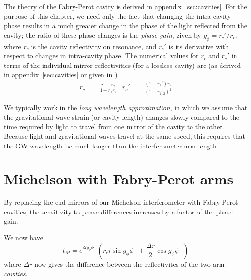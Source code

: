 The theory of the Fabry-Perot cavity is derived in 
appendix~\ref{sec:cavities}.  For the purpose of this chapter, we
need only the fact that changing the intra-cavity phase results in a
much greater change in the phase of the light reflected from the
cavity; the ratio of these phase changes is the \emph{phase gain},
given by $g_\phi = r_c'/r_c$, where $r_c$ is the cavity reflectivity on
resonance, and $r_c'$ is its derivative with respect to changes in
intra-cavity phase.  The numerical values for $r_c$ and $r_c'$ in terms of the individual mirror reflectivities (for a lossless cavity) are (as derived in appendix~\ref{sec:cavities} or given in \cite{LigoFreqResponse97}):
%
\begin{align}
r_c & = \frac{r_1 - r_2}{1 - r_1 r_2} &
r_c'& = \frac{\left(1 - {r_1}^2\right)r_2}{\left(1 - r_1 r_2\right)^2}
\end{align}



\label{sec:long-wavelength}We typically work in the \emph{long wavelength approximation}, in
which we assume that the gravitational wave strain (or cavity length)
changes slowly compared to the time required by light to travel from
one mirror of the cavity to the other.  Because light and
gravitational waves travel at the same speed, this requires that the
GW wavelength be much longer than the interferometer arm length.  

\section{Michelson with Fabry-Perot arms}

By replacing the end mirrors of our Michelson interferometer with
Fabry-Perot cavities, the sensitivity to phase differences increases
by a factor of the phase gain.  

We now have
\begin{equation}
t_M  = e^{i 2 g_\phi \phi_+} 
\left( r_c i \sin g_\phi \phi_- + 
        \frac{\Delta r}{2} \cos g_\phi \phi_- \right)
\end{equation}
where $\Delta r$ now gives the difference between the reflectivites of the
two arm \emph{cavities}.

